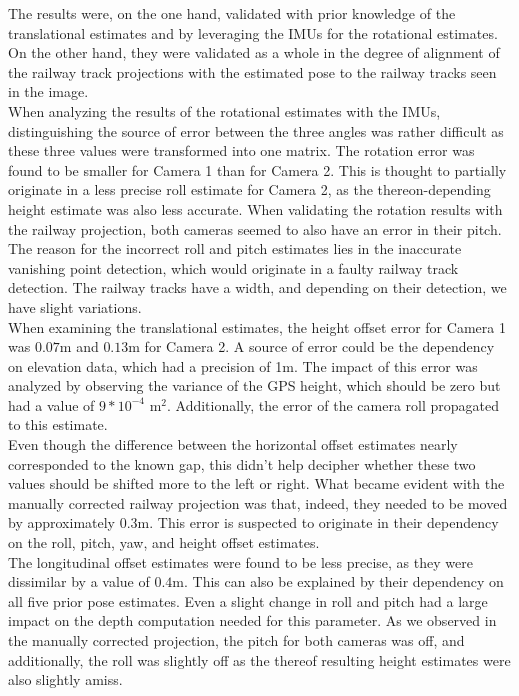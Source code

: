 The results were, on the one hand, validated with prior knowledge of the translational estimates and by leveraging the IMUs for the rotational estimates. On the other hand, they were validated as a whole in the degree of alignment of the railway track projections with the estimated pose to the railway tracks seen in the image. \\

When analyzing the results of the rotational estimates with the IMUs, distinguishing the source of error between the three angles was rather difficult as these three values were transformed into one matrix. The rotation error was found to be smaller for Camera 1 than for Camera 2. This is thought to partially originate in a less precise roll estimate for Camera 2, as the thereon-depending height estimate was also less accurate. When validating the rotation results with the railway projection, both cameras seemed to also have an error in their pitch. The reason for the incorrect roll and pitch estimates lies in the inaccurate vanishing point detection, which would originate in a faulty railway track detection. The railway tracks have a width, and depending on their detection, we have slight variations.\\


When examining the translational estimates, the height offset error for Camera 1 was $0.07$m and $0.13$m for Camera 2. A source of error could be the dependency on elevation data, which had a precision of 1m. The impact of this error was analyzed by observing the variance of the GPS height, which should be zero but had a value of $9*10^{-4}$ m$^2$. Additionally, the error of the camera roll propagated to this estimate.\\

Even though the difference between the horizontal offset estimates nearly corresponded to the known gap, this didn't help decipher whether these two values should be shifted more to the left or right. What became evident with the manually corrected railway projection was that, indeed, they needed to be moved by approximately $0.3$m. This error is suspected to originate in their dependency on the roll, pitch, yaw, and height offset estimates.\\

The longitudinal offset estimates were found to be less precise, as they were dissimilar by a value of $0.4$m. This can also be explained by their dependency on all five prior pose estimates. Even a slight change in roll and pitch had a large impact on the depth computation needed for this parameter. As we observed in the manually corrected projection, the pitch for both cameras was off, and additionally, the roll was slightly off as the thereof resulting height estimates were also slightly amiss.\\


